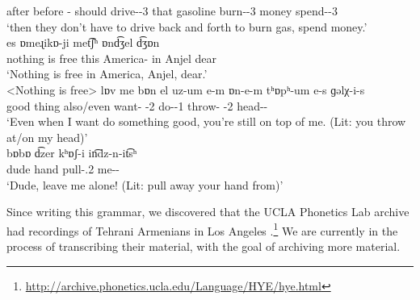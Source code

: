 \begin{exe}
\begin{xlist}
 after   before   {\neggloss}-{\auxgloss}   should   drive-{\thgloss}-3{\pl}   that   gasoline   burn-{\thgloss}-3{\pl}   money   spend-{\thgloss}-3{\pl} 
 \\ \trans `then they don’t have to drive back and forth to burn gas, spend money.' \\
\ex {}   es   ɒmeɻikɒ-ji   met͡ʃʰ   ɒnd͡ʒel   d͡ʒɒn  \\
 nothing is free   this   America-{\gen}   in   Anjel   dear  \\
 \trans `Nothing is free in America, Anjel, dear.' \\
<Nothing is free> 
\ex \gll  lɒv   me   bɒn el   uz-um e-m   ɒn-e-m       tʰɒpʰ-um e-s   ɡəlχ-i-s\\ 
 good   {\indf}   thing also/even   want-{\impfcvb} {\auxgloss}-2{\sg}   do-{\thgloss}-1{\sg}   throw-{\impfcvb} {\auxgloss}-2{\sg}   head-{\dat}-{\possFsg}  \\
\trans `Even when I want do something good, you’re still on top of me. (Lit: you throw at/on my head)'\\
	\ex \gll    bɒbɒ   d͡zer   kʰɒʃ-i   in͡dz-n-it͡sʰ   \\ 
	 dude   hand   pull-{\imp}.2{\sg}   me-{\nx}-{\abl}  \\ 
	\trans `Dude, leave me alone! (Lit: pull away your hand from)' \\
\end{xlist} 
\end{exe}

\begin{sloppypar}
Since writing this grammar, we discovered that the UCLA Phonetics Lab archive had recordings of Tehrani Armenians in Los Angeles \citep{UCLAPhoneticsLabArchive}.\footnote{\url{http://archive.phonetics.ucla.edu/Language/HYE/hye.html}} We are currently in the process of transcribing their material, with the goal of archiving more material.
\end{sloppypar}
